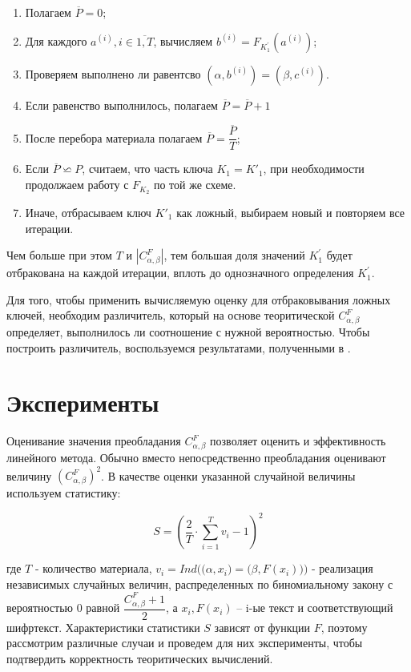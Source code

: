 \documentclass[utf8x, 14pt]{G7-32} %
\begin{document}
\begin{enumerate}
    \item Полагаем $\overline{P} = 0$;
    \item Для каждого $a^{(i)}, i\in\overline{1,T}$, вычисляем $b^{(i)} = F_{K_1^{'}}(a^{(i)})$; 
    \item Проверяем выполнено ли равентсво $(\alpha, b^{(i)}) = (\beta, c^{(i)})$. 
    \item Если равенство выполнилось, полагаем $\overline{P} = \overline{P} + 1$
    \item После перебора материала полагаем $\overline{P} = \dfrac{\overline{P}}{T}$;
    \item Если $\overline{P} \backsimeq P$, считаем, что часть ключа $K_1 = K'_1$, при необходимости продолжаем работу с $F_{K_2}$ по той же схеме.
    \item Иначе, отбрасываем ключ $K'_1$ как ложный, выбираем новый и повторяем все итерации.
\end{enumerate}

Чем больше при этом $T$ и $|C_{\alpha, \beta}^F|$, тем большая доля значений $K_1^{'}$ будет отбракована на каждой итерации, вплоть до однозначного определения $K_1^{'}$.

Для того, чтобы применить вычисляемую оценку для отбраковывания ложных ключей, необходим различитель, который на основе теоритической $C_{\alpha, \beta}^F$ определяет, выполнилось ли соотношение с нужной вероятностью. Чтобы построить различитель, воспользуемся результатами, полученными в \cite{main_paper}.

\chapter{Эксперименты}
Оценивание значения преобладания $C_{\alpha, \beta}^F$ позволяет оценить и эффективность линейного метода. Обычно вместо непосредственно преобладания оценивают величину $(C_{\alpha, \beta}^F)^2$. В качестве оценки указанной случайной величины используем статистику:

$$ S = \left(\dfrac{2}{T} \cdot \sum_{i = 1}^T v_i - 1\right)^2$$

где $T$ - количество материала, $ v_i = Ind\Big(\big(\alpha, x_i\big) = \big(\beta, F(x_i)\big)\Big) $ - реализация независимых случайных величин, распределенных по биномиальному закону с вероятностью 0 равной $ \dfrac{C_{\alpha, \beta}^F + 1}{2}$, а $x_i, F(x_i)$ -- i-ые текст и соответствующий шифртекст. Характеристики статистики $S$ зависят от функции $F$, поэтому рассмотрим различные случаи и проведем для них эксперименты, чтобы подтвердить корректность теоритических вычислений.
\end{document}
